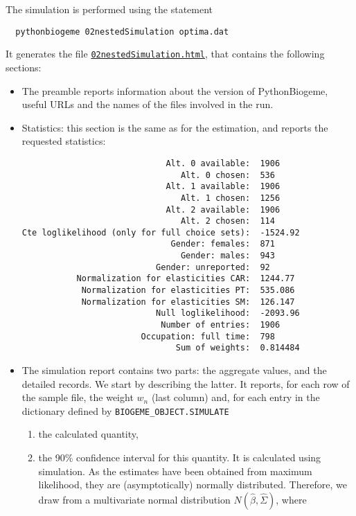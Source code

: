 \documentclass[12pt,a4paper]{article}
\begin{document}
The simulation is performed using the statement
\begin{lstlisting}
  pythonbiogeme 02nestedSimulation optima.dat
\end{lstlisting}
It generates the file \href{http://biogeme.epfl.ch/examples/indicators/python/02nestedSimulation.html}{\lstinline$02nestedSimulation.html$}, that
contains the following sections:
\begin{itemize}
  \item The preamble reports information about the version of
    PythonBiogeme, useful URLs and the names of the files involved in
    the run.
  \item Statistics: this section is the same as for the estimation,
    and reports the requested statistics:

\begin{lstlisting}    
                             Alt. 0 available:	1906
                                Alt. 0 chosen:	536
                             Alt. 1 available:	1906
                                Alt. 1 chosen:	1256
                             Alt. 2 available:	1906
                                Alt. 2 chosen:	114
Cte loglikelihood (only for full choice sets):	-1524.92
                              Gender: females:	871
                                Gender: males:	943
                           Gender: unreported:	92
           Normalization for elasticities CAR:	1244.77
            Normalization for elasticities PT:	535.086
            Normalization for elasticities SM:	126.147
                           Null loglikelihood:	-2093.96
                            Number of entries:	1906
                        Occupation: full time:	798
                               Sum of weights:	0.814484
\end{lstlisting}
\item The simulation report contains two parts: the aggregate values,
  and the detailed records. We start by describing the latter.
It reports, for each row of the sample file, the weight $w_n$ (last column) and, for each entry in
the dictionary defined by \lstinline$BIOGEME_OBJECT.SIMULATE$
\begin{enumerate}
\item the calculated quantity,
\item the 90\% confidence interval for this quantity. It is calculated
  using simulation. As the estimates have been obtained from
  maximum likelihood, they are (asymptotically) normally
  distributed. Therefore, we draw from a multivariate normal
  distribution $N(\widehat{\beta},\widehat{\Sigma})$, where

\end{enumerate}
\end{itemize}
\end{document}
